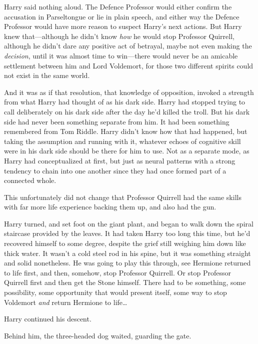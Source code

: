 Harry said nothing aloud. The Defence Professor would either confirm the accusation in Parseltongue or lie in plain speech, and either way the Defence Professor would have more reason to suspect Harry's next actions. But Harry knew that—although he didn't know \emph{how} he would stop Professor Quirrell, although he didn't dare any positive act of betrayal, maybe not even making the \emph{decision}, until it was almost time to win—there would never be an amicable settlement between him and Lord Voldemort, for those two different spirits could not exist in the same world.

And it was as if that resolution, that knowledge of opposition, invoked a strength from what Harry had thought of as his dark side. Harry had stopped trying to call deliberately on his dark side after the day he'd killed the troll. But his dark side had never been something separate from him. It had been something remembered from Tom Riddle. Harry didn't know how that had happened, but taking the assumption and running with it, whatever echoes of cognitive skill were in his dark side should be there for him to use. Not as a separate mode, as Harry had conceptualized at first, but just as neural patterns with a strong tendency to chain into one another since they had once formed part of a connected whole.

This unfortunately did not change that Professor Quirrell had the same skills with far more life experience backing them up, and also had the gun.

Harry turned, and set foot on the giant plant, and began to walk down the spiral staircase provided by the leaves. It had taken Harry too long this time, but he'd recovered himself to some degree, despite the grief still weighing him down like thick water. It wasn't a cold steel rod in his spine, but it was something straight and solid nonetheless. He was going to play this through, see Hermione returned to life first, and then, somehow, stop Professor Quirrell. Or stop Professor Quirrell first and then get the Stone himself. There had to be something, some possibility, some opportunity that would present itself, some way to stop Voldemort \emph{and} return Hermione to life{\ldots}

Harry continued his descent.

Behind him, the three-headed dog waited, guarding the gate.

